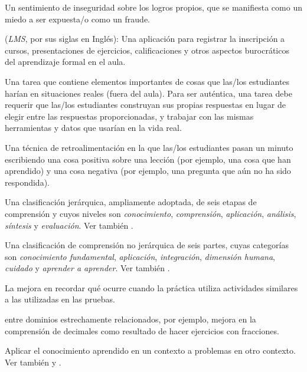 \begin{description}
 Un sentimiento de inseguridad sobre
los logros propios, que se manifiesta como un miedo a ser expuesta/o como un fraude.

 (\emph{LMS}, por sus siglas en Inglés): Una aplicación para registrar 
la inscripción a cursos, presentaciones de ejercicios, calificaciones y otros aspectos burocráticos del aprendizaje formal en el aula.

 Una tarea que contiene elementos importantes
de cosas que las/los estudiantes harían en situaciones reales (fuera del aula). Para
ser auténtica, una tarea debe requerir que las/los estudiantes construyan sus propias respuestas
en lugar de elegir entre las respuestas proporcionadas, y trabajar con las mismas
herramientas y datos que usarían en la vida real.

 Una técnica de retroalimentación en la
que las/los estudiantes pasan un minuto escribiendo una cosa positiva sobre una lección
(por ejemplo, una cosa que han aprendido) y una cosa negativa (por ejemplo, una pregunta que aún no ha sido respondida).

 Una clasificación jerárquica, ampliamente adoptada,
de seis etapas de comprensión y cuyos niveles son \emph{conocimiento},
\emph{comprensión}, \emph{aplicación}, \emph{análisis}, \emph{síntesis} y
\emph{evaluación}.
Ver también .

 Una clasificación de comprensión no jerárquica de seis partes, 
cuyas categorías son \emph{conocimiento fundamental}, \emph{aplicación}, \emph{integración}, \emph{dimensión humana}, \emph{cuidado} y
\emph{aprender a aprender}. Ver también .

 La mejora en  recordar qué ocurre 
cuando la práctica utiliza actividades similares a las utilizadas en las pruebas.

  
entre dominios estrechamente relacionados, por ejemplo, mejora en la comprensión de decimales como resultado 
de hacer ejercicios con fracciones.

 Aplicar el conocimiento aprendido en un contexto a problemas en otro contexto.  Ver también
 y .


\end{description}
